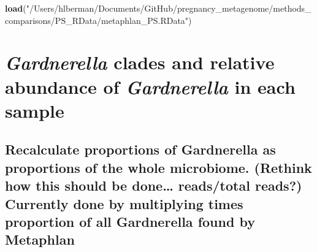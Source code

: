 \documentclass[]{article}
\newenvironment{Shaded}{\begin{snugshade}}{\end{snugshade}}
\newcommand{\KeywordTok}[1]{\textcolor[rgb]{0.13,0.29,0.53}{\textbf{{#1}}}}
\newcommand{\StringTok}[1]{\textcolor[rgb]{0.31,0.60,0.02}{{#1}}}
\newcommand{\NormalTok}[1]{{#1}}
\begin{document}
\begin{Shaded}
\begin{Highlighting}[]
\KeywordTok{load}\NormalTok{(}\StringTok{"/Users/hlberman/Documents/GitHub/pregnancy_metagenome/methods_comparisons/PS_RData/metaphlan_PS.RData"}\NormalTok{)}
\end{Highlighting}
\end{Shaded}

\section{\texorpdfstring{\emph{Gardnerella} clades and relative
abundance of \emph{Gardnerella} in each
sample}{Gardnerella clades and relative abundance of Gardnerella in each sample}}\label{gardnerella-clades-and-relative-abundance-of-gardnerella-in-each-sample}

\subsection{Recalculate proportions of Gardnerella as proportions of the
whole microbiome. (Rethink how this should be done\ldots{} reads/total
reads?) Currently done by multiplying times proportion of all
Gardnerella found by
Metaphlan}\label{recalculate-proportions-of-gardnerella-as-proportions-of-the-whole-microbiome.-rethink-how-this-should-be-done-readstotal-reads-currently-done-by-multiplying-times-proportion-of-all-gardnerella-found-by-metaphlan}
\end{document}
